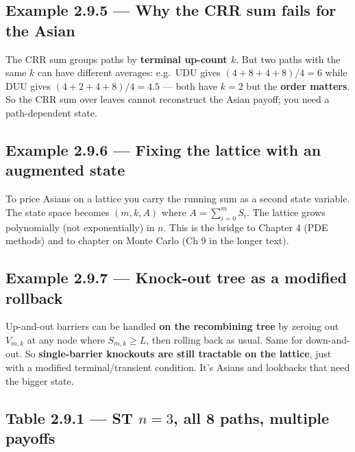 \documentclass[
  10pt,
  twoside]{book}
\begin{document}
\subsection{Example 2.9.5 --- Why the CRR sum fails for the
Asian}\label{example-2.9.5-why-the-crr-sum-fails-for-the-asian}

The CRR sum groups paths by \textbf{terminal up-count \(k\)}. But two
paths with the same \(k\) can have different averages: e.g.~UDU gives
\((4+8+4+8)/4=6\) while DUU gives \((4+2+4+8)/4=4.5\) --- both have
\(k=2\) but the \textbf{order matters}. So the CRR sum over leaves
cannot reconstruct the Asian payoff; you need a path-dependent state.

\subsection{Example 2.9.6 --- Fixing the lattice with an augmented
state}\label{example-2.9.6-fixing-the-lattice-with-an-augmented-state}

To price Asians on a lattice you carry the running sum as a second state
variable. The state space becomes \((m, k, A)\) where
\(A=\sum_{i=0}^m S_i\). The lattice grows polynomially (not
exponentially) in \(n\). This is the bridge to Chapter 4 (PDE methods)
and to chapter on Monte Carlo (Ch 9 in the longer text).

\subsection{Example 2.9.7 --- Knock-out tree as a modified
rollback}\label{example-2.9.7-knock-out-tree-as-a-modified-rollback}

Up-and-out barriers can be handled \textbf{on the recombining tree} by
zeroing out \(V_{m,k}\) at any node where \(S_{m,k}\ge L\), then rolling
back as usual. Same for down-and-out. So \textbf{single-barrier
knockouts are still tractable on the lattice}, just with a modified
terminal/transient condition. It's Asians and lookbacks that need the
bigger state.

\subsection{\texorpdfstring{Table 2.9.1 --- ST \(n=3\), all 8 paths,
multiple
payoffs}{Table 2.9.1 --- ST n=3, all 8 paths, multiple payoffs}}\label{table-2.9.1-st-n3-all-8-paths-multiple-payoffs}
\end{document}
